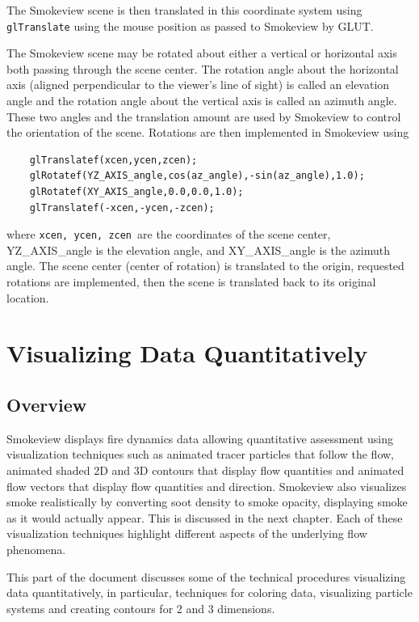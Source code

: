 \documentclass[11pt,twoside]{book}
\begin{document}
The Smokeview scene is then translated in this coordinate system using {\tt glTranslate}
using the mouse position as passed to Smokeview by GLUT.

The Smokeview scene may be rotated about either a vertical or horizontal axis both passing through the scene center.  The rotation angle about the horizontal axis (aligned perpendicular to the viewer's line of sight) is called an elevation angle and the rotation angle about the vertical axis is called an azimuth angle.
These two angles and the translation amount are used by Smokeview to control the orientation of the scene.   Rotations are then implemented in Smokeview using
\begin{verbatim}
    glTranslatef(xcen,ycen,zcen);
    glRotatef(YZ_AXIS_angle,cos(az_angle),-sin(az_angle),1.0);
    glRotatef(XY_AXIS_angle,0.0,0.0,1.0);
    glTranslatef(-xcen,-ycen,-zcen);
\end{verbatim}
where {\tt xcen, ycen, zcen}\ are the coordinates of the scene center, YZ\_AXIS\_angle is the elevation angle, and XY\_AXIS\_angle is the azimuth angle.  The scene center (center of rotation) is translated to the origin, requested rotations are implemented, then the scene is translated back to its original location.

%
%
\part{Visualizing Data Quantitatively}

%
%

\chapter{Overview}
Smokeview displays fire dynamics data allowing quantitative assessment using
visualization techniques such as animated tracer
particles that follow the flow, animated shaded 2D and 3D contours
that display flow quantities and animated flow vectors that
display flow quantities and direction. Smokeview also visualizes
smoke realistically by converting soot density to smoke opacity,
displaying smoke as it would actually appear. This is discussed in the next chapter.
Each of these visualization
techniques highlight different aspects of the underlying flow
phenomena.  

This part of the document discusses some of the technical procedures visualizing data quantitatively, in particular, techniques for coloring data, visualizing particle systems and creating contours for 2 and 3 dimensions.
\end{document}
